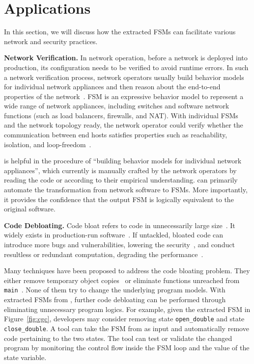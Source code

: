 
\section{Applications}
\label{sec:app}

In this section, we will discuss how the extracted FSMs can facilitate 
various network and security practices.  


\noindent\textbf{Network Verification.}  In network operation, before a network 
is deployed into production, its configuration needs to be verified to avoid 
runtime errors. In such a network verification process, network operators 
usually build behavior models for individual network appliances and then 
reason about the end-to-end properties of the 
network~\cite{mai2011debugging,khurshid2013veriflow,kazemian2012header,kazemian2013real,fayaz2016buzz,panda2017verifying}. 
FSM is an expressive 
behavior model to represent a wide range of network appliances, including 
switches and software network functions (such as load balancers, firewalls, 
and NAT). With individual FSMs and the network topology ready, the network 
operator could verify whether the communication between end hosts satisfies 
properties such as reachability, isolation, and loop-freedom~\cite{xxx}.

\Tool{} is helpful in the procedure of ``building behavior models for 
individual network appliances'', which currently is manually crafted by 
the network operators by reading the code or according to their 
empirical understanding. \Tool{} can primarily automate the 
transformation from network software to FSMs. More importantly, it 
provides the confidence that the output FSM is logically equivalent 
to the original software.


\noindent\textbf{Code Debloating.}
Code bloat refers to code in unnecessarily large size~\cite{code-bloat}.
It widely exists in production-run software~\cite{code-bloat-study}. 
If untackled, bloated code can introduce more bugs and vulnerabilities, 
lowering the security~\cite{protocol-mao}, 
and conduct resultless or redundant computation, 
degrading the performance~\cite{BloatFSE2008,XuBloatPLDI2009,XuBloatPLDI2010}. 

Many techniques have been proposed to address the code bloating problem. 
They either remove temporary object copies~\cite{BloatFSE2008,XuBloatPLDI2009,
XuBloatPLDI2010,Reusable,Cachetor} 
or eliminate functions unreached from 
\texttt{main}~\cite{container-debloating-1, 
container-debloating-2, dinghao-1}. 
None of them try to change the underlying program models.
With extracted FSMs from \Tool{}, 
further code debloating can be performed through
eliminating unnecessary program logics. 
For example, given the extracted FSM in Figure~\ref{fig:cgc}, 
developers may consider removing state \texttt{open\_double} and 
state \texttt{close\_double}. 
A tool can take the FSM from \Tool{} as input and automatically 
remove code pertaining to the two states. 
The tool can test or validate the changed program 
by monitoring the control flow 
inside the FSM loop and the value of the state variable.


